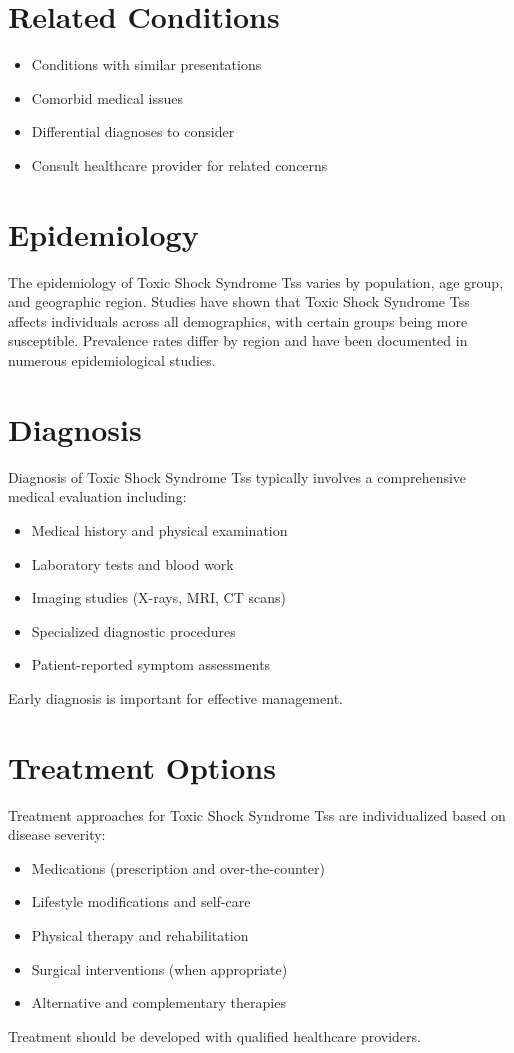 \section*{Related Conditions}
\begin{itemize}
  \item Conditions with similar presentations
  \item Comorbid medical issues
  \item Differential diagnoses to consider
  \item Consult healthcare provider for related concerns
\end{itemize}

\section*{Epidemiology}
The epidemiology of Toxic Shock Syndrome Tss varies by population, age group, and geographic region. Studies have shown that Toxic Shock Syndrome Tss affects individuals across all demographics, with certain groups being more susceptible. Prevalence rates differ by region and have been documented in numerous epidemiological studies.

\section*{Diagnosis}
Diagnosis of Toxic Shock Syndrome Tss typically involves a comprehensive medical evaluation including:
\begin{itemize}
  \item Medical history and physical examination
  \item Laboratory tests and blood work
  \item Imaging studies (X-rays, MRI, CT scans)
  \item Specialized diagnostic procedures
  \item Patient-reported symptom assessments
\end{itemize}
Early diagnosis is important for effective management.

\section*{Treatment Options}
Treatment approaches for Toxic Shock Syndrome Tss are individualized based on disease severity:
\begin{itemize}
  \item Medications (prescription and over-the-counter)
  \item Lifestyle modifications and self-care
  \item Physical therapy and rehabilitation
  \item Surgical interventions (when appropriate)
  \item Alternative and complementary therapies
\end{itemize}
Treatment should be developed with qualified healthcare providers.

